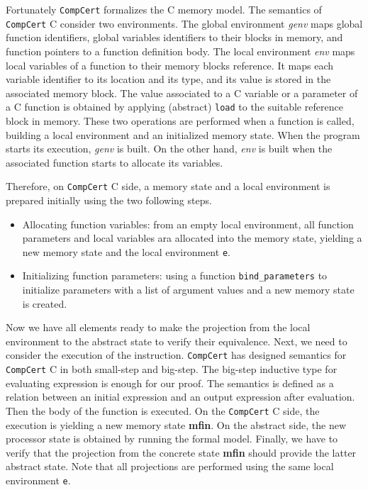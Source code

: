 \documentclass[twocolumn]{article}
\newcommand{\compcert}{\texttt{CompCert}\xspace}
\begin{document}
Fortunately \compcert formalizes the C memory model.  The semantics of
\compcert C consider two environments. The global environment
\emph{genv} maps global function identifiers, global variables
identifiers to their blocks in memory, and function pointers to a
function definition body.  The local environment \emph{env} maps local
variables of a function to their memory blocks reference.  It maps
each variable identifier to its location and its type, and its value
is stored in the associated memory block.  The value associated to a C
variable or a parameter of a C function is obtained by applying
(abstract) \texttt{load} to the suitable reference block in memory.
These two operations are performed when a function is called, building
a local environment and an initialized memory state. When the program
starts its execution, \emph{genv} is built.  On the other hand,
\emph{env} is built when the associated function starts to allocate
its variables.

Therefore, on \compcert C side, a memory state and a local environment
is prepared initially using the two following steps.
\begin{itemize}
\item Allocating function variables: from an empty local environment,
  all function parameters and local variables ara allocated into the
  memory state, yielding a new memory state and the local environment
  \texttt{e}.
\item Initializing function parameters: using a function
  \texttt{bind\_parameters} to initialize parameters with a list of
  argument values and a new memory state is created.
\end{itemize}

Now we have all elements ready to make the projection from the local
environment to the abstract state to verify their equivalence.
Next, we need to consider the execution of the instruction.  \compcert
has designed semantics for \compcert C in both small-step and
big-step.  The big-step inductive type for evaluating expression is
enough for our proof.  The semantics is defined as a relation between
an initial expression and an output expression after evaluation.  Then
the body of the function is executed.  On the \compcert C side, the
execution is yielding a new memory state \textbf{mfin}.  On the
abstract side, the new processor state is obtained by running the
formal model.  Finally, we have to verify that the projection from the
concrete state \textbf{mfin} should provide the latter abstract
state.  Note that all projections are performed using the same local
environment \texttt{e}.
\end{document}

